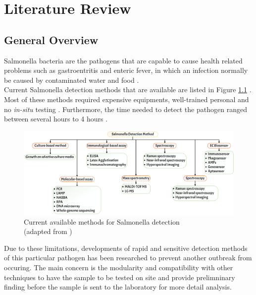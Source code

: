 \chapter{Literature Review}
\section{General Overview}
Salmonella bacteria are the pathogens that are capable to cause health related problems such as gastroentritis and enteric fever, in which an infection normally be caused by contaminated water and food \cite{bellRecentEmergingInnovations2016,pashazadehNanomaterialsUseSensing2017, pacholewiczEnvironmentalSamplingMethods2023,wangRecentAdvances3D2021}.\\

Current Salmonella detection methods that are available are listed in Figure \ref{CurrSalmDetecMetho} \cite{awangAdvancementSalmonellaDetection2021}. Most of these methods required expensive equipments, well-trained personal and no \textit{in-situ} testing \cite{shenBiosensorsRapidDetection2021,wangOverviewRapidDetection2021}. Furthermore, the time needed to detect the pathogen ranged between several hours to 4 hours  \cite{awangAdvancementSalmonellaDetection2021}.
\begin{figure}[h!]
    \centering
    \includegraphics[width=\linewidth]{Figures/Awang_2021_Salmonella_Detection.png}
    \caption{Current available methods for Salmonella detection \\ (adapted from \cite{awangAdvancementSalmonellaDetection2021})}
    \label{CurrSalmDetecMetho}
\end{figure}

Due to these limitations, developments of rapid and sensitive detection methods of this particular pathogen has been researched to prevent another outbreak from occuring. The main concern is the modularity and compatibility with other techniques to have the sample to be tested on site and provide prelimninary finding before the sample is sent to the laboratory for more detail analysis.\newpage


